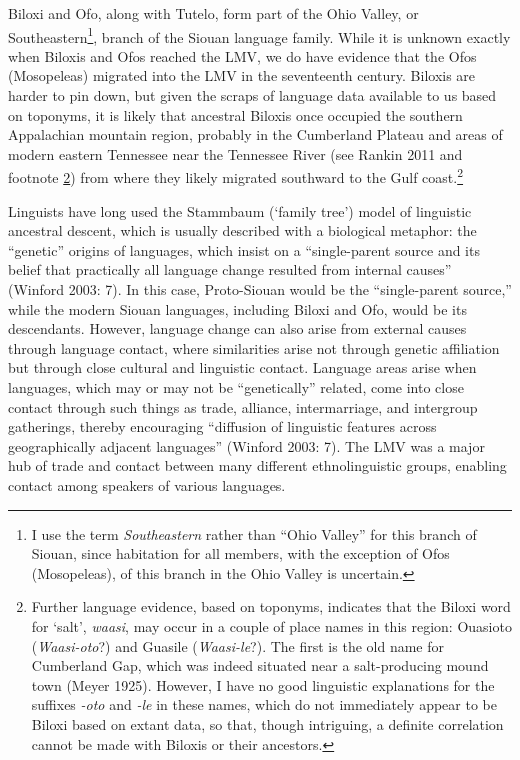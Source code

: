 \documentclass[output=paper]{LSP/langsci}
\begin{document}
Biloxi and Ofo, along with Tutelo, form part of the Ohio Valley, or Southeastern\footnote{I use the term \emph{Southeastern} rather than “Ohio Valley” for this branch of Siouan, since habitation for all members, with the exception of Ofos (Mosopeleas), of this branch in the Ohio Valley is uncertain.}, branch of the Siouan language family. While it is unknown exactly when Biloxis and Ofos reached the LMV, we do have evidence that the Ofos (Mosopeleas) migrated into the LMV in the seventeenth century. Biloxis are harder to pin down, but given the scraps of language data available to us based on toponyms, it is likely that ancestral Biloxis once occupied the southern Appalachian mountain region, probably in the Cumberland Plateau and areas of modern eastern Tennessee near the Tennessee River (see Rankin 2011 and footnote \ref{waasi}) from where they likely migrated southward to the Gulf coast.\footnote{\label{waasi}Further language evidence, based on toponyms, indicates that the Biloxi word for `salt', \emph{waasi}, may occur in a couple of place names in this region: Ouasioto (\emph{Waasi-oto}?) and Guasile (\emph{Waasi-le}?). The first is the old name for Cumberland Gap, which was indeed situated near a salt-producing mound town (Meyer 1925). However, I have no good linguistic explanations for the suffixes \emph{-oto} and \emph{-le} in these names, which do not immediately appear to be Biloxi based on extant data, so that, though intriguing, a definite correlation cannot be made with Biloxis or their ancestors.}

Linguists have long used the Stammbaum (`family tree') model of linguistic ancestral descent, which is usually described with a biological metaphor: the “genetic” origins of languages, which insist on a “single-parent source and its belief that practically all language change resulted from internal causes” (Winford 2003: 7). In this case, Proto-Siouan would be the “single-parent source,” while the modern Siouan languages, including Biloxi and Ofo, would be its descendants. However, language change can also arise from external causes through language contact, where similarities arise not through genetic affiliation but through close cultural and linguistic contact. Language areas arise when languages, which may or may not be “genetically” related, come into close contact through such things as trade, alliance, intermarriage, and intergroup gatherings, thereby encouraging “diffusion of linguistic features across geographically adjacent languages” (Winford 2003: 7). The LMV was a major hub of trade and contact between many different ethnolinguistic groups, enabling contact among speakers of various languages. 
\end{document}
